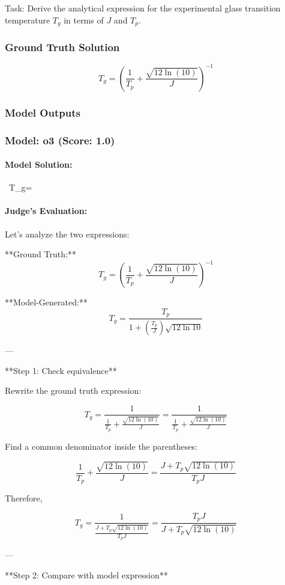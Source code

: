 \documentclass[10pt]{article}
\begin{document}
Task:
Derive the analytical expression for the experimental glass transition temperature $T_g$ in terms of $J$ and $T_p$.

\subsubsection*{Ground Truth Solution}
\[ \boxed{T_g = \left( \frac{1}{T_p} + \frac{\sqrt{12 \ln(10)}}{J} \right)^{-1}} \]

\subsubsection*{Model Outputs}
\subsubsection*{Model: o3 (Score: 1.0)}
\paragraph*{Model Solution:}
\, T_g= \,

\paragraph*{Judge's Evaluation:}

Let's analyze the two expressions:

**Ground Truth:**
\[
T_g = \left( \frac{1}{T_p} + \frac{\sqrt{12 \ln(10)}}{J} \right)^{-1}
\]

**Model-Generated:**
\[
T_g = \frac{T_p}{1 + \left(\frac{T_p}{J}\right) \sqrt{12 \ln 10}}
\]

---

**Step 1: Check equivalence**

Rewrite the ground truth expression:

\[
T_g = \frac{1}{\frac{1}{T_p} + \frac{\sqrt{12 \ln(10)}}{J}} = \frac{1}{\frac{1}{T_p} + \frac{\sqrt{12 \ln(10)}}{J}}
\]

Find a common denominator inside the parentheses:

\[
\frac{1}{T_p} + \frac{\sqrt{12 \ln(10)}}{J} = \frac{J + T_p \sqrt{12 \ln(10)}}{T_p J}
\]

Therefore,

\[
T_g = \frac{1}{\frac{J + T_p \sqrt{12 \ln(10)}}{T_p J}} = \frac{T_p J}{J + T_p \sqrt{12 \ln(10)}}
\]

---

**Step 2: Compare with model expression**
\end{document}
